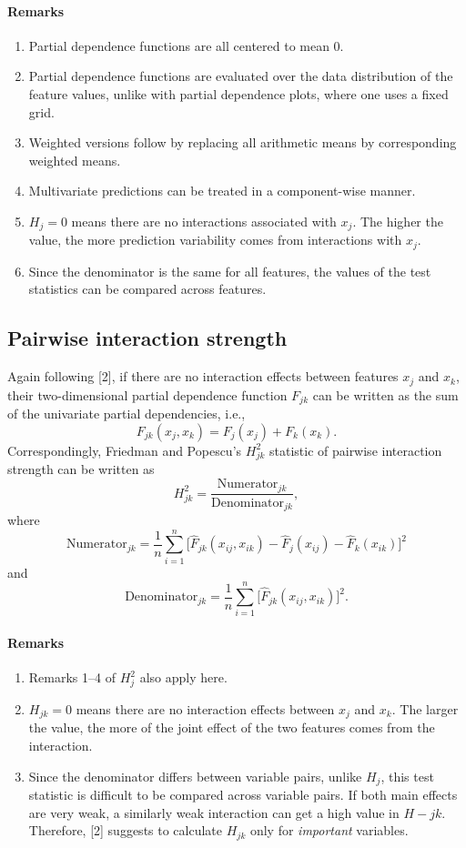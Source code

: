 \documentclass[]{article}
\begin{document}
\paragraph{Remarks}
\begin{enumerate}
	\item Partial dependence functions are all centered to mean 0.
	\item Partial dependence functions are evaluated over the data distribution of the feature values, unlike with partial dependence plots, where one uses a fixed grid.
	\item Weighted versions follow by replacing all arithmetic means by corresponding weighted means.
	\item Multivariate predictions can be treated in a component-wise manner.
	\item $H_j = 0$ means there are no interactions associated with $x_j$. The higher the value, the more prediction variability comes from interactions with $x_j$.
	\item Since the denominator is the same for all features, the values of the test statistics can be compared across features.
\end{enumerate}

\subsection{Pairwise interaction strength}
Again following [2], if there are no interaction effects between features $x_j$ and $x_k$, their two-dimensional partial dependence function $F_{jk}$ can be written as the sum of the univariate partial dependencies, i.e.,
$$
  F_{jk}(x_j, x_k) = F_j(x_j)+ F_k(x_k).
$$
Correspondingly, Friedman and Popescu's $H_{jk}^2$ statistic of pairwise interaction strength can be written as
$$
	H_{jk}^2 = \frac{\textrm{Numerator}_{jk}}{\textrm{Denominator}_{jk}},
$$
where 
$$
  {\textrm{Numerator}_{jk}} = \frac{1}{n} \sum_{i = 1}^n\big[\hat F_{jk}(x_{ij}, x_{ik}) - \hat F_j(x_{ij}) - \hat F_k(x_{ik})\big]^2
$$
and
$$
  {\textrm{Denominator}_{jk}} = \frac{1}{n} \sum_{i = 1}^n\big[\hat F_{jk}(x_{ij}, x_{ik})\big]^2.
$$
\paragraph{Remarks}
\begin{enumerate}
	\item Remarks 1--4 of $H^2_{j}$ also apply here.
	\item $H_{jk} = 0$ means there are no interaction effects between $x_j$ and $x_k$. The larger the value, the more of the joint effect of the two features comes from the interaction.
	\item Since the denominator differs between variable pairs, unlike $H_j$, this test statistic is difficult to be compared across variable pairs. If both main effects are very weak, a similarly weak interaction can get a high value in $H-{jk}$. Therefore, [2] suggests to calculate $H_{jk}$ only for {\em important} variables.
\end{enumerate}
\end{document}
